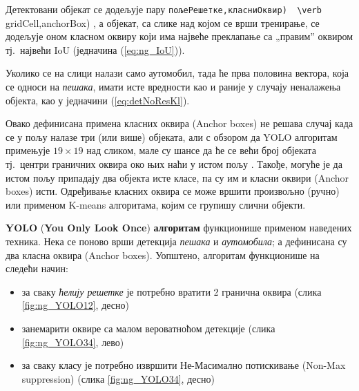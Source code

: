 \documentclass[12pt, а4paper]{article}
\begin{document}
Детектовани објекат се додељује пару
\verb (пољеРешетке,класниОквир)  \verb (gridCell,anchorBox) , а
објекат, са слике над којом се врши тренирање, се додељује оном
класном оквиру који има највеће преклапање са „правим” оквиром тј.\ највећи
IoU (једначина (\ref{eq:ng_IoU})).

Уколико се на слици налази само аутомобил, тада ће прва половина вектора, која
се односи на \textit{пешака}, имати исте вредности као и раније у
случају неналажења објекта,  као у једначини (\ref{eq:detNoResKl}).

Овако дефинисана примена класних оквира (Anchor boxes) не решава случај
када се у пољу  налазе три (или више) објеката, али с обзором
да YOLO алгоритам примењује \mbox{$19 \times 19$}  над сликом,
мале су шансе да ће се већи број објеката тј.\ центри граничних оквира
око њих наћи у истом пољу .
Такође, могуће је да истом пољу припадају два објекта исте класе, па су
им и класни оквири (Anchor boxes) исти. Одређивање класних оквира
се може вршити произвољно (ручно) или применом K-means алгоритама, којим
се групишу слични објекти.

\newpage
\textbf{YOLO} (\textbf{You Only Look Once}) \textbf{алгоритам}
функционише применом наведених техника.
Нека се поново врши детекција \textit{пешака} и \textit{аутомобила};
а дефинисана су два класна оквира (Anchor boxes).
Уопштено, алгоритам функционише на следећи начин:
\begin{itemize}
 \item за сваку \textit{ћелију решетке} је потребно вратити 2 гранична
 оквира (слика \ref{fig:ng_YOLO12}, десно)
 \item занемарити оквире са малом вероватноћом детекције
 (слика \ref{fig:ng_YOLO34}, лево)
 \item за сваку класу је потребно извршити Не-Масимално
 потискивање (Non-Max suppression) (слика \ref{fig:ng_YOLO34}, десно)
\end{itemize}
\end{document}
